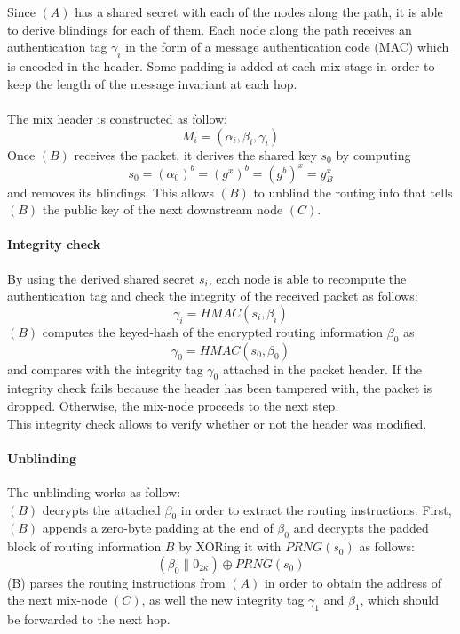     \\~\\Since $(A)$ has a shared secret with each of the nodes along the path, it is able to derive blindings for each of them.
    \newline Each node along the path receives an authentication tag $\gamma_i$ in the form of a message authentication code (MAC)
which is encoded in the header.
\newline Some padding is added at each mix stage in order to keep the length of the message invariant at each hop.
\\~\\The mix header is constructed as follow: $$M_i=(\alpha_i,\beta_i,\gamma_i)$$
\newline Once $(B)$ receives the packet, it derives the shared key $s_0$ by computing $$s_0=(\alpha_0)^b=(g^x)^b=(g^b)^x=y^x_B$$ and removes its blindings. This allows $(B)$ to unblind the routing info that tells $(B)$ the public key of the next downstream node $(C)$.
\paragraph{Integrity check}
By using the derived shared secret $s_i$, each node is able to recompute the authentication tag and check the integrity of the received packet as follows: $$\gamma_i=HMAC(s_i,\beta_i)$$
$(B)$ computes the keyed-hash of the encrypted routing information $\beta_0$ as $$\gamma_0=HMAC(s_0,\beta_0)$$ and compares with the integrity tag $\gamma_0$ attached in the packet header. If the integrity check fails because the header has been tampered with, the packet is dropped. Otherwise, the mix-node proceeds to the next step.
\\This integrity check allows to verify whether or not the header was modified.

\paragraph{Unblinding}
The unblinding works as follow:
\\$(B)$ decrypts the attached $\beta_0$ in order to extract the routing instructions. First, $(B)$ appends a zero-byte padding at the end of $\beta_0$ and decrypts the padded block of routing information $B$ by XORing it with $PRNG(s_{0})$ as follows:
$$(\beta_0\|0_{2\kappa})\oplus PRNG(s_{0})$$
(B) parses the routing instructions from $(A)$ in order to obtain the address of the next mix-node $(C)$, as well the new integrity tag $\gamma_1$ and $\beta_1$, which should be forwarded to the next hop.
